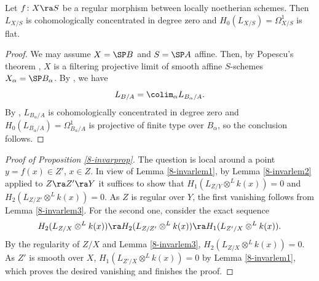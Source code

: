 \documentclass[10pt]{../fichiers-configuration-latex/smfart}
\begin{document}
\begin{lemma2}\label{8-invarlem3} Let $f {\colon} X \ra S$ be a
regular morphism between locally noetherian schemes. Then $L_{X/S}$
is cohomologically concentrated in degree zero and $H_0(L_{X/S})
= \Omega^1_{X/S}$ is flat.  \end{lemma2} \begin{proof} We may
assume $X = \SP B$ and $S = \SP A$ affine. Then, by Popescu's
theorem \cite[1.1]{NPD@Swan}, $X$ is a filtering projective limit
of smooth affine $S$-schemes $X_{\alpha} = \SP B_{\alpha}$. By
\cite[II (1.2.3.4)]{Illusie@cotangent}, we have $$ L_{B/A} =
\colim_{\alpha} L_{B_{\alpha}/A}.  $$ By \cite[III 3.1.2 and II
2.3.6.3]{Illusie@cotangent}, $L_{B_{\alpha}/A}$ is cohomologically
concentrated in degree zero and $H_0(L_{B_{\alpha}/A}) =
\Omega^1_{B_{\alpha}/A}$ is projective of finite type over
$B_{\alpha}$, so the conclusion follows.  \end{proof}

\begin{proof}[Proof of Proposition \ref{8-invarprop}] The question is
local around a point $y = f(x) \in Z'$, $x \in Z$. In view of Lemma
\ref{8-invarlem1}, by Lemma \ref{8-invarlem2} applied to $Z \ra Z'
\ra Y$ it suffices to show that $H_1(L_{Z/Y} \otimes^L k(x)) = 0$
and $H_2(L_{Z/Z'} \otimes^L k(x)) = 0$. As $Z$ is regular over $Y$,
the first vanishing follows from Lemma \ref{8-invarlem3}. For the
second one, consider the exact sequence
 $$
H_2(L_{Z/X} \otimes^L k(x)) \ra H_2(L_{Z/Z'} \otimes^L k(x)) \ra
H_1(L_{Z'/X} \otimes^L k(x)).  $$ By the regularity of $Z/X$ and
Lemma \ref{8-invarlem3}, $H_2(L_{Z/X} \otimes^L k(x)) = 0$. As $Z'$
is smooth over $X$, $H_1(L_{Z'/X} \otimes^L k(x)) = 0$ by Lemma
\ref{8-invarlem1}, which proves the desired vanishing and finishes
the proof.  \end{proof}
\end{document}
